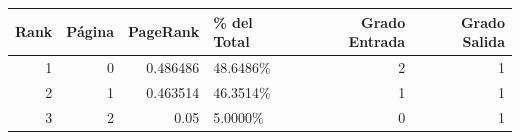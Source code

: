 \begin{tabular}{rrrlrr}
\toprule
   Rank &   Página &   PageRank & \% del Total   &   Grado Entrada &   Grado Salida \\
\midrule
      1 &        0 &   0.486486 & 48.6486\%      &               2 &              1 \\
      2 &        1 &   0.463514 & 46.3514\%      &               1 &              1 \\
      3 &        2 &   0.05     & 5.0000\%       &               0 &              1 \\
\bottomrule
\end{tabular}